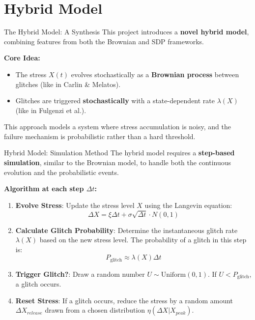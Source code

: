 \section{Hybrid Model}

\begin{frame}{The Hybrid Model: A Synthesis}
	This project introduces a \textbf{novel hybrid model}, combining features from both the Brownian and SDP frameworks.
	
	\vspace{0.5cm}
	\textbf{Core Idea:}
	\begin{itemize}
		\item The stress $X(t)$ evolves stochastically as a \textbf{Brownian process} between glitches (like in Carlin \& Melatos).
		\vspace{0.2cm}
		\item Glitches are triggered \textbf{stochastically} with a state-dependent rate $\lambda(X)$ (like in Fulgenzi et al.).
	\end{itemize}
	
	\vspace{0.3cm}
	This approach models a system where stress accumulation is noisy, and the failure mechanism is probabilistic rather than a hard threshold.
\end{frame}

\begin{frame}{Hybrid Model: Simulation Method}
	The hybrid model requires a \textbf{step-based simulation}, similar to the Brownian model, to handle both the continuous evolution and the probabilistic events.

    \vspace{0.3cm}
    \textbf{Algorithm at each step $\Delta t$:}
	\begin{enumerate}
		\item \textbf{Evolve Stress}: Update the stress level $X$ using the Langevin equation:
		$$ \Delta X = \xi \Delta t + \sigma \sqrt{\Delta t} \cdot N(0,1) $$
		
		\item \textbf{Calculate Glitch Probability}: Determine the instantaneous glitch rate $\lambda(X)$ based on the new stress level. The probability of a glitch in this step is:
		$$ P_{\text{glitch}} \approx \lambda(X) \Delta t $$
		
		\item \textbf{Trigger Glitch?}: Draw a random number $U \sim \text{Uniform}(0,1)$. If $U < P_{\text{glitch}}$, a glitch occurs.
		
		\item \textbf{Reset Stress}: If a glitch occurs, reduce the stress by a random amount $\Delta X_{release}$ drawn from a chosen distribution $\eta(\Delta X | X_{peak})$.
	\end{enumerate}
\end{frame}

